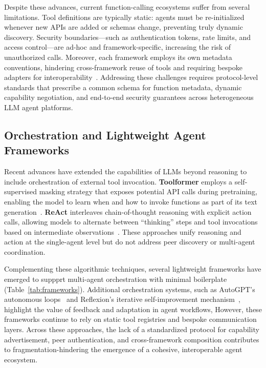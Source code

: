 \documentclass{article}
\begin{document}
Despite these advances, current function-calling ecosystems suffer from several limitations.  Tool definitions are typically static: agents must be re-initialized whenever new APIs are added or schemas change, preventing truly dynamic discovery.  Security boundaries—such as authentication tokens, rate limits, and access control—are ad-hoc and framework-specific, increasing the risk of unauthorized calls.  Moreover, each framework employs its own metadata conventions, hindering cross-framework reuse of tools and requiring bespoke adapters for interoperability~\cite{liu2024autotool}.  Addressing these challenges requires protocol-level standards that prescribe a common schema for function metadata, dynamic capability negotiation, and end-to-end security guarantees across heterogeneous LLM agent platforms.




\subsection{Orchestration and Lightweight Agent Frameworks}
Recent advances have extended the capabilities of LLMs beyond reasoning to include orchestration of  external tool invocation. \textbf{Toolformer} employs a self-supervised masking strategy that exposes potential API calls during pretraining, enabling the model to learn when and how to invoke functions as part of its text generation~\cite{le2023toolformer}.  \textbf{ReAct} interleaves chain-of-thought reasoning with explicit action calls, allowing models to alternate between “thinking” steps and tool invocations based on intermediate observations~\cite{yao2023react}.  These approaches unify reasoning and action at the single-agent level but do not address peer discovery or multi-agent coordination.

Complementing these algorithmic techniques, several lightweight frameworks have emerged to suppprt multi-agent orchestration with minimal boilerplate (Table~\ref{tab:frameworks}). Additional orchestration systems, such as AutoGPT’s autonomous loops~\cite{autogen2023} and Reflexion’s iterative self-improvement mechanism~\cite{shinn2023reflexion}, highlight the value of feedback and adaptation in agent workflows, However, these frameworks continue to rely on static tool registries and bespoke communication layers.  Across these approaches, the lack of a standardized protocol for capability advertisement, peer authentication, and cross-framework composition contributes to fragmentation-hindering the emergence of a cohesive, interoperable agent ecosystem.
\end{document}
